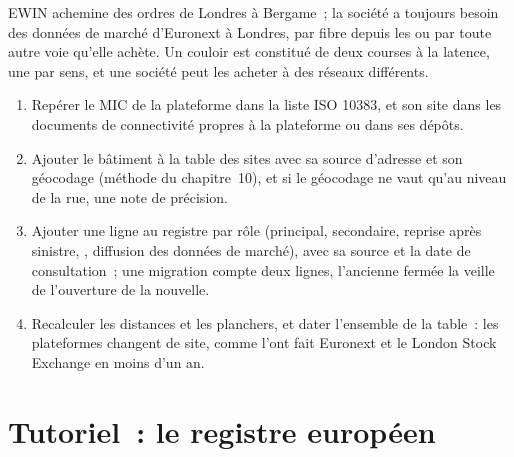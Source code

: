 \begin{remark}\label{rem:nw:the-european-map:direction}
EWIN achemine des ordres de Londres à Bergame~; la société a toujours besoin des données de marché d'Euronext à Londres, par fibre depuis les  ou par
toute autre voie qu'elle achète. Un couloir est constitué de deux courses à la latence, une par sens, et une société peut les acheter à des réseaux différents.
\end{remark}

\begin{method}\label{met:nw:the-european-map:add}
\begin{enumerate}
\item Repérer le MIC de la plateforme dans la liste ISO 10383, et son site dans les documents de connectivité propres à la plateforme ou dans ses dépôts.
\item Ajouter le bâtiment à la table des sites avec sa source d'adresse et son géocodage (méthode du chapitre~10), et
  si le géocodage ne vaut qu'au niveau de la rue, une note de précision.
\item Ajouter une ligne au registre par rôle (principal, secondaire, reprise après sinistre, , diffusion des données de marché), avec sa source
  et la date de consultation~; une migration compte deux lignes, l'ancienne fermée la veille de l'ouverture de la nouvelle.
\item Recalculer les distances et les planchers, et dater l'ensemble de la table~: les plateformes changent de site, comme l'ont fait Euronext et le London Stock Exchange en moins d'un an.
\end{enumerate}
\end{method}

\label{lst:nw:the-european-map:dates}

\section{Tutoriel~: le registre européen}\label{tut:nw:the-european-map:tut}

